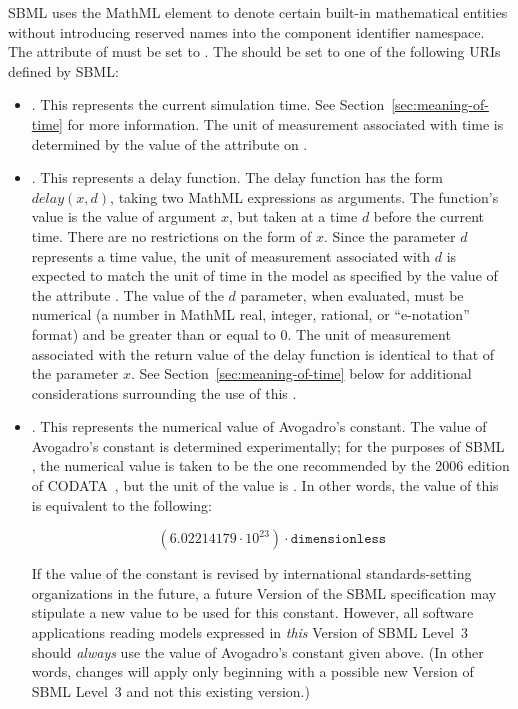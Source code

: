 SBML \thisL uses the MathML  element to denote
certain built-in mathematical entities without introducing
reserved names into the component identifier namespace.  The
 attribute of  must be set to
.  The  should be set to one of the
following URIs defined by SBML:
\begin{itemize}

\item {}.  This
  represents the current simulation time.  See
  Section~\ref{sec:meaning-of-time} for more information.  The
  unit of measurement associated with time is determined by the
  value of the attribute  on \Model.

\item {}.  This
  represents a delay function.  The delay function has the form
  $delay(x, d)$, taking two MathML expressions as arguments.  The
  function's value is the value of argument $x$, but taken at a
  time $d$ before the current time.  There are no restrictions on
  the form of $x$.  Since the parameter $d$ represents a time
  value, the unit of measurement associated with $d$ is expected
  to match the unit of time in the model as specified by the value
  of the \Model attribute .  The value of the $d$
  parameter, when evaluated, must be numerical (\ie a number in
  MathML real, integer, rational, or ``e-notation'' format) and be
  greater than or equal to 0.  The unit of measurement associated
  with the return value of the delay function is identical to that
  of the parameter $x$.  See Section~\ref{sec:meaning-of-time}
  below for additional considerations surrounding the use of this
  .

\item {}.  This
  represents the numerical value of Avogadro's constant.  The
  value of Avogadro's constant is determined experimentally; for
  the purposes of SBML \thisLVnum, the numerical value is taken to
  be the one recommended by the 2006 edition of
  CODATA~\citep{codata_2008}, but the unit of the value is
  .  In other words, the value of this
   is equivalent to the following:
  \begin{linenomath}
    \begin{equation*}
      (6.02214179 \cdot 10^{23}) \cdot \texttt{dimensionless}
    \end{equation*}
  \end{linenomath}
  If the value of the constant is revised by international
  standards-setting organizations in the future, a future Version
  of the SBML \thisL specification may stipulate a new value to be
  used for this  constant.  However, all software
  applications reading models expressed in \emph{this} Version of
  SBML Level~3 should \emph{always} use the value of Avogadro's
  constant given above.  (In other words, changes will apply only
  beginning with a possible new Version of SBML Level~3 and not
  this existing version.)

\end{itemize}

